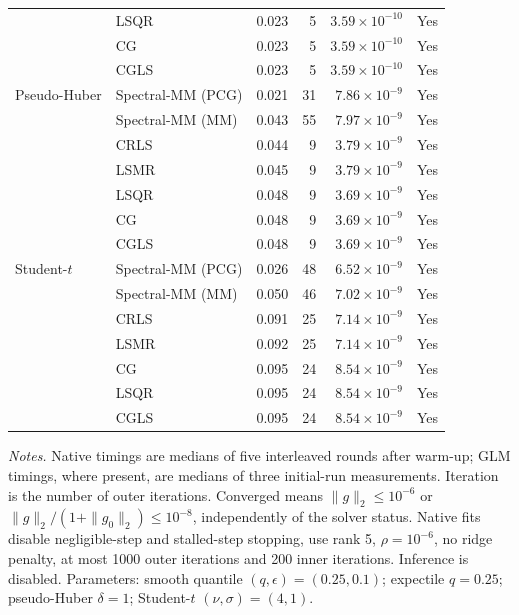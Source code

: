 \documentclass[10pt,a4paper]{article}
\begin{document}
\begin{longtable}{llrrrc}
 & LSQR & 0.023 & 5 & $3.59\times10^{-10}$ & Yes \\
 & CG & 0.023 & 5 & $3.59\times10^{-10}$ & Yes \\
 & CGLS & 0.023 & 5 & $3.59\times10^{-10}$ & Yes \\
\midrule
Pseudo-Huber & Spectral-MM (PCG) & 0.021 & 31 & $7.86\times10^{-9}$ & Yes \\
 & Spectral-MM (MM) & 0.043 & 55 & $7.97\times10^{-9}$ & Yes \\
 & CRLS & 0.044 & 9 & $3.79\times10^{-9}$ & Yes \\
 & LSMR & 0.045 & 9 & $3.79\times10^{-9}$ & Yes \\
 & LSQR & 0.048 & 9 & $3.69\times10^{-9}$ & Yes \\
 & CG & 0.048 & 9 & $3.69\times10^{-9}$ & Yes \\
 & CGLS & 0.048 & 9 & $3.69\times10^{-9}$ & Yes \\
\midrule
Student-$t$ & Spectral-MM (PCG) & 0.026 & 48 & $6.52\times10^{-9}$ & Yes \\
 & Spectral-MM (MM) & 0.050 & 46 & $7.02\times10^{-9}$ & Yes \\
 & CRLS & 0.091 & 25 & $7.14\times10^{-9}$ & Yes \\
 & LSMR & 0.092 & 25 & $7.14\times10^{-9}$ & Yes \\
 & CG & 0.095 & 24 & $8.54\times10^{-9}$ & Yes \\
 & LSQR & 0.095 & 24 & $8.54\times10^{-9}$ & Yes \\
 & CGLS & 0.095 & 24 & $8.54\times10^{-9}$ & Yes \\
\end{longtable}
\noindent\textit{Notes.} Native timings are medians of five interleaved rounds after warm-up; GLM timings, where present, are medians of three initial-run measurements. Iteration is the number of outer iterations. Converged means $\|g\|_2\leq10^{-6}$ or $\|g\|_2/(1+\|g_0\|_2)\leq10^{-8}$, independently of the solver status. Native fits disable negligible-step and stalled-step stopping, use rank 5, $\rho=10^{-6}$, no ridge penalty, at most 1000 outer iterations and 200 inner iterations. Inference is disabled.
Parameters: smooth quantile $(q,\epsilon)=(0.25,0.1)$; expectile $q=0.25$; pseudo-Huber $\delta=1$; Student-$t$ $(\nu,\sigma)=(4,1)$.
\par
\endgroup
\end{document}

